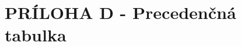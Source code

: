 \documentclass[Slovak, a4paper, 12pt]{article}
\begin{document}
	\section{PRÍLOHA D - Precedenčná tabulka}
	\begin{figure}[ht]
		\begin{center}
		\end{center}
	\end{figure}
	
\end{document}
